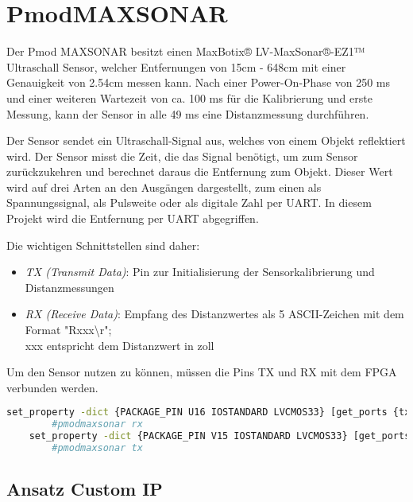 \chapter{PmodMAXSONAR}

Der Pmod MAXSONAR besitzt einen MaxBotix® LV-MaxSonar®-EZ1™ Ultraschall Sensor, welcher Entfernungen von 15cm - 648cm mit einer Genauigkeit von 2.54cm messen kann.
Nach einer Power-On-Phase von 250 ms und einer weiteren Wartezeit von ca. 100 ms für die Kalibrierung und erste Messung, kann der Sensor in alle 49 ms eine Distanzmessung durchführen.
\newline

Der Sensor sendet ein Ultraschall-Signal aus, welches von einem Objekt reflektiert wird. Der Sensor misst die Zeit, die das Signal benötigt, um zum Sensor zurückzukehren und berechnet daraus die Entfernung zum Objekt.
Dieser Wert wird auf drei Arten an den Ausgängen dargestellt, zum einen als Spannungssignal, als Pulsweite oder als digitale Zahl per UART. In diesem Projekt wird die Entfernung per UART abgegriffen.
\newline

Die wichtigen Schnittstellen sind daher:

\begin{itemize}
    \item \textit{TX (Transmit Data)}: Pin zur Initialisierung der Sensorkalibrierung und Distanzmessungen
    \item \textit{RX (Receive Data)}: Empfang des Distanzwertes als 5 ASCII-Zeichen mit dem Format "Rxxx\textbackslash r"; \\
        xxx entspricht dem Distanzwert in zoll
\end{itemize}

Um den Sensor nutzen zu können, müssen die Pins TX und RX mit dem FPGA verbunden werden.

\begin{lstlisting}[language=bash,caption={Pin-Zuordnung im Constraints-File},breaklines=true,captionpos=b,basicstyle=\footnotesize\ttfamily,
    label={lst:fpga_pins_maxsonar}]
    set_property -dict {PACKAGE_PIN U16 IOSTANDARD LVCMOS33} [get_ports {tx_out}];
        #pmodmaxsonar rx
    set_property -dict {PACKAGE_PIN V15 IOSTANDARD LVCMOS33} [get_ports {rx_in}];
        #pmodmaxsonar tx
\end{lstlisting}

\section{Ansatz Custom IP}

